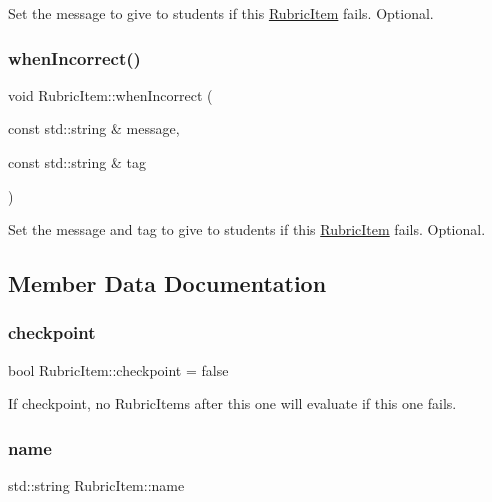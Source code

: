 Set the message to give to students if this \hyperlink{class_rubric_item}{Rubric\+Item} fails. Optional. \hypertarget{class_rubric_item_a90a45d8e42eb51b4f85ebdb2963da26b}{}\label{class_rubric_item_a90a45d8e42eb51b4f85ebdb2963da26b} 
\subsubsection{\texorpdfstring{when\+Incorrect()}{whenIncorrect()}\hspace{0.1cm}{\footnotesize\ttfamily [2/2]}}
{\footnotesize\ttfamily void Rubric\+Item\+::when\+Incorrect (\begin{DoxyParamCaption}\item[{const std\+::string \&}]{message,  }\item[{const std\+::string \&}]{tag }\end{DoxyParamCaption})}

Set the message and tag to give to students if this \hyperlink{class_rubric_item}{Rubric\+Item} fails. Optional. 

\subsection{Member Data Documentation}
\hypertarget{class_rubric_item_a0f240be9e7b0dc6853b3e2b0df5713b8}{}\label{class_rubric_item_a0f240be9e7b0dc6853b3e2b0df5713b8} 
\subsubsection{\texorpdfstring{checkpoint}{checkpoint}}
{\footnotesize\ttfamily bool Rubric\+Item\+::checkpoint = false}

If checkpoint, no Rubric\+Items after this one will evaluate if this one fails. \hypertarget{class_rubric_item_accc3649acf6ae1bb543b56d826a3d01f}{}\label{class_rubric_item_accc3649acf6ae1bb543b56d826a3d01f} 
\subsubsection{\texorpdfstring{name}{name}}
{\footnotesize\ttfamily std\+::string Rubric\+Item\+::name}

